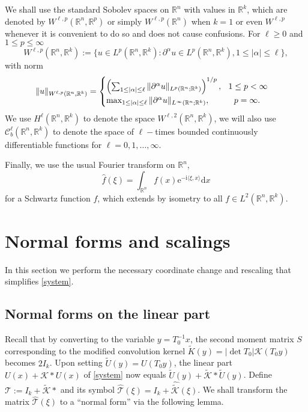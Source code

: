 \documentclass[10pt]{article}
\newcommand{\R}{\mathbb{R}}
\newcommand{\rmd}{\mathrm{d}}
\newcommand{\rme}{\mathrm{e}}
\newcommand{\rmi}{\mathrm{i}}
\newcommand{\K}{\mathcal{K}}
\newcommand{\That}{\widehat{\mathcal{T}}}
\begin{document}
We shall use the standard Sobolev spaces on $\R^n$ with values in $\R^k$, which are denoted by $W^{\ell,p}(\R^n, \R^p)$ or simply $W^{\ell,p}(\R^n)$ when $k=1$ or even $W^{\ell,p}$ whenever it is convenient to do so and does not cause confusions. For $\ell \ge 0$ and $1\le p \le \infty$
\[
W^{\ell,p}(\R^n,\R^k) := \{ u \in L^p(\R^n,\R^k): \partial^\alpha u \in L^p(\R^n,\R^k), 1\le |\alpha| \le \ell \},
\]
with norm
\[
\|u\|_{W^{\ell,p}(\R^n,\R^k)}=
\begin{cases}
\left(\sum_{1\le |\alpha| \le \ell} \|\partial^\alpha u \|_{L^p(\R^n;\R^k)}\right)^{1/p}, \hspace{0.1in}1\le p<\infty \\
\max_{1\le |\alpha| \le \ell}\|\partial^\alpha u\|_{L^\infty(\R^n;\R^k)}, \hspace{0.4in} p=\infty.
\end{cases}
\]
We use $H^\ell(\R^n,\R^k)$ to denote the space $W^{\ell,2}(\R^n,\R^k)$, we will also use $\mathscr{C}_b^\ell(\R^n,\R^k)$ to denote the space of $\ell-$times bounded continuously differentiable functions for $\ell=0,1,\ldots,\infty$.
 
Finally, we use the usual Fourier transform on $\R^n$, 
\[
\widehat{f} (\xi)= \int_{\R^n} f(x)\rme^{-\rmi \langle \xi,x\rangle}\rmd x
\]
 for a Schwartz function $f$, which extends by isometry to all $f \in L^2(\R^n,\R^k)$. 


\section{Normal forms and scalings}\label{s:2}
In this section we perform the necessary coordinate change and rescaling that simplifies \eqref{system}.

\subsection{Normal forms on the linear part}
Recall that by converting to the variable $y = T_0^{-1}x$, the second moment matrix $S$ corresponding to the modified convolution kernel $\tilde{K}(y) = |\det T_0| \K(T_0y)$ becomes $2I_{k}$. Upon setting $\tilde{U}(y) = U(T_0 y)$, the linear part $U(x)+\K\ast U (x)$ of \eqref{system} now equals $\tilde{U}(y) + \tilde{\K}\ast \tilde{U}(y)$. Define $\mathcal{T} :=I_k + \tilde{\K}\ast$ and its symbol $\That (\xi) = I_k + \widehat{\tilde{\K}} (\xi)$. We shall transform the matrix $\widehat{\mathcal{T}}(\xi)$ to a ``normal form'' via the following lemma. 
\end{document}
